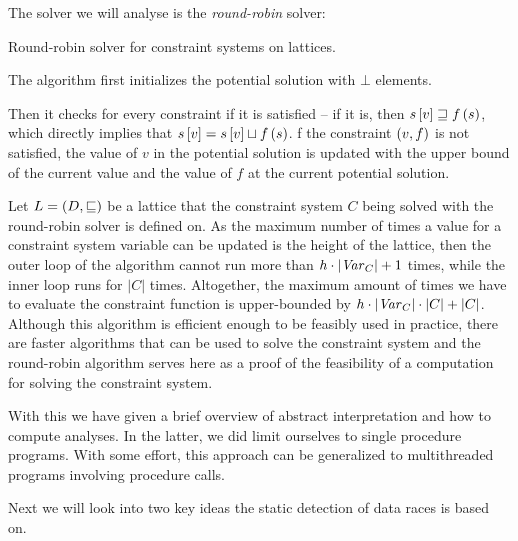 \documentclass[..thesis.tex]{subfiles}
\begin{document}
The solver we will analyse is the \textit{round-robin} solver:


\begin{algorithm}[H]
\label{round-robin}
\caption{Round-robin solver for constraint systems on lattices.}
\end{algorithm}
The algorithm first initializes the potential solution with $\bot$ elements.

Then it checks for every constraint if it is satisfied -- if it is, then $s \left[ v \right] \sqsupseteq f \left( s \right)$,
which directly implies that $s \left[ v \right] = s \left[ v \right] \sqcup f \left( s \right)$. 
f the constraint $\left( v, f \right)$  is not satisfied, the value of $v$ in the potential solution is updated with the upper bound of the current
value and the value of $f$ at the current potential solution.

Let $L = \left( D, \sqsubseteq \right)$ be a lattice that the constraint system $C$ being solved with the round-robin solver is defined on.
As the maximum number of times a value for a constraint system variable can be updated is the height of the lattice,
then the outer loop of the algorithm cannot run more than $h \cdot \left| \mathit{Var}_C \right| + 1$ times, while the inner loop runs for $\left| C \right|$ times.
Altogether, the maximum amount of times we have to evaluate the constraint function is upper-bounded by $h \cdot \left| \mathit{Var}_C \right| \cdot \left| C \right| + \left| C \right|$.
Although this algorithm is efficient enough to be feasibly used in practice,
there are faster algorithms that can be used to solve the constraint system and
the round-robin algorithm serves here as a proof of the feasibility of a computation for solving the constraint system.

With this we have given a brief overview of abstract interpretation and how to compute analyses. In the latter,
we did limit ourselves to single procedure programs. With some effort, this approach can be generalized to multithreaded programs involving procedure calls.

Next we will look into two key ideas the static detection of data races is based on.
\end{document}
